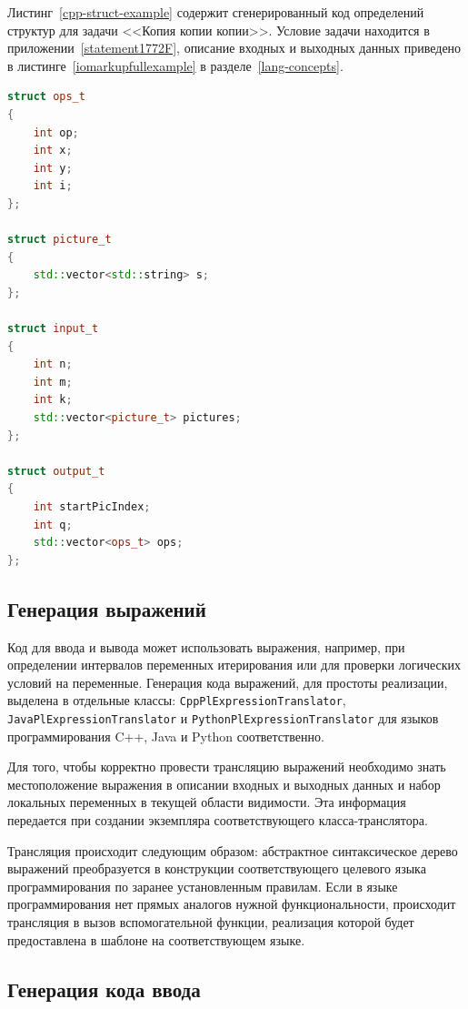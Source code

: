 \documentclass[times,specification,annotation]{style/itmo-student-thesis/itmo-student-thesis}
\begin{document}
Листинг~\ref{cpp-struct-example} содержит сгенерированный код определений структур для задачи <<Копия копии копии>>. Условие задачи находится в приложении~\ref{statement1772F}, описание входных и выходных данных приведено в листинге~\ref{iomarkupfullexample} в разделе~\ref{lang-concepts}.

\begin{lstlisting}[float=!h,caption={Пример сгенерированного кода объявлений структур на языке~C++},label={cpp-struct-example},language=c++]
struct ops_t
{
    int op;
    int x;
    int y;
    int i;
};

struct picture_t
{
    std::vector<std::string> s;
};

struct input_t
{
    int n;
    int m;
    int k;
    std::vector<picture_t> pictures;
};

struct output_t
{
    int startPicIndex;
    int q;
    std::vector<ops_t> ops;
};
\end{lstlisting}

\subsection{Генерация выражений}

Код для ввода и вывода может использовать выражения, например, при определении интервалов переменных итерирования или для проверки логических условий на переменные. Генерация кода выражений, для простоты реализации, выделена в отдельные классы: \texttt{CppPlExpressionTranslator}, \texttt{JavaPlExpressionTranslator} и \texttt{PythonPlExpressionTranslator} для языков программирования C++, Java и Python соответственно.

Для того, чтобы корректно провести трансляцию выражений необходимо знать местоположение выражения в описании входных и выходных данных и набор локальных переменных в текущей области видимости. Эта информация передается при создании экземпляра соответствующего класса-транслятора.

Трансляция происходит следующим образом: абстрактное синтаксическое дерево выражений преобразуется в конструкции соответствующего целевого языка программирования по заранее установленным правилам. Если в языке программирования нет прямых аналогов нужной функциональности, происходит трансляция в вызов вспомогательной функции, реализация которой будет предоставлена в шаблоне на соответствующем языке.

\subsection{Генерация кода ввода}
\end{document}
